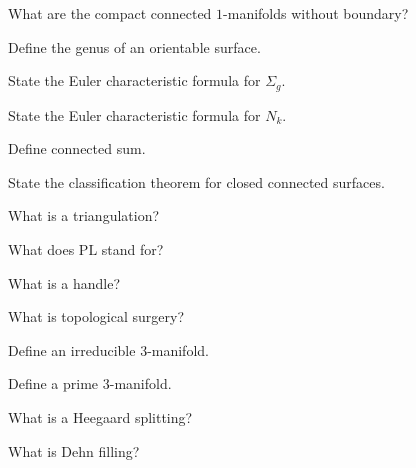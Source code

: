 \begin{exercise}[1]
What are the compact connected \(1\)-manifolds without boundary?
\end{exercise}

\begin{exercise}[1]
Define the genus of an orientable surface.
\end{exercise}

\begin{exercise}[1]
State the Euler characteristic formula for \(\Sigma_g\).
\end{exercise}

\begin{exercise}[1]
State the Euler characteristic formula for \(N_k\).
\end{exercise}

\begin{exercise}[1]
Define connected sum.
\end{exercise}

\begin{exercise}[1]
State the classification theorem for closed connected surfaces.
\end{exercise}

\begin{exercise}[1]
What is a triangulation?
\end{exercise}

\begin{exercise}[1]
What does \(\mathrm{PL}\) stand for?
\end{exercise}

\begin{exercise}[1]
What is a handle?
\end{exercise}

\begin{exercise}[1]
What is topological surgery?
\end{exercise}

\begin{exercise}[1]
Define an irreducible \(3\)-manifold.
\end{exercise}

\begin{exercise}[1]
Define a prime \(3\)-manifold.
\end{exercise}

\begin{exercise}[1]
What is a Heegaard splitting?
\end{exercise}

\begin{exercise}[1]
What is Dehn filling?
\end{exercise}

